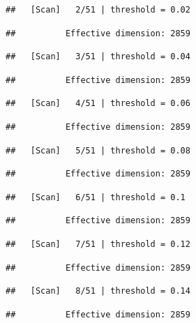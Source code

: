 \documentclass[
]{book}
\begin{document}
\begin{verbatim}
##   [Scan]   2/51 | threshold = 0.02
\end{verbatim}

\begin{verbatim}
##          Effective dimension: 2859
\end{verbatim}

\begin{verbatim}
##   [Scan]   3/51 | threshold = 0.04
\end{verbatim}

\begin{verbatim}
##          Effective dimension: 2859
\end{verbatim}

\begin{verbatim}
##   [Scan]   4/51 | threshold = 0.06
\end{verbatim}

\begin{verbatim}
##          Effective dimension: 2859
\end{verbatim}

\begin{verbatim}
##   [Scan]   5/51 | threshold = 0.08
\end{verbatim}

\begin{verbatim}
##          Effective dimension: 2859
\end{verbatim}

\begin{verbatim}
##   [Scan]   6/51 | threshold = 0.1
\end{verbatim}

\begin{verbatim}
##          Effective dimension: 2859
\end{verbatim}

\begin{verbatim}
##   [Scan]   7/51 | threshold = 0.12
\end{verbatim}

\begin{verbatim}
##          Effective dimension: 2859
\end{verbatim}

\begin{verbatim}
##   [Scan]   8/51 | threshold = 0.14
\end{verbatim}

\begin{verbatim}
##          Effective dimension: 2859
\end{verbatim}
\end{document}
